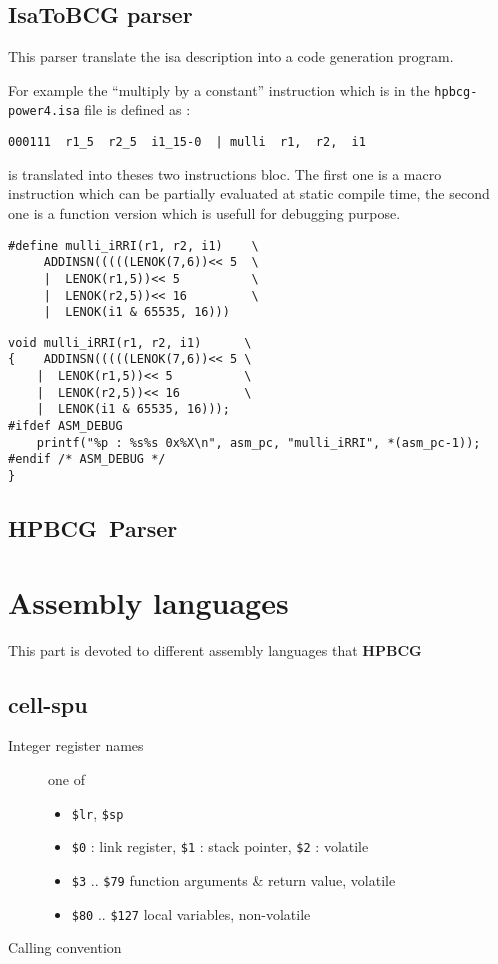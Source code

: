 \documentclass{article}
\newcommand{\hpbcg}{\textbf{HPBCG}\ }
\begin{document}
\subsection{IsaToBCG parser}

This parser translate the isa description into a code generation
program.

For example the ``multiply by a constant'' instruction which is in the
\texttt{hpbcg-power4.isa} file is defined as :

\begin{verbatim}
000111  r1_5  r2_5  i1_15-0  | mulli  r1,  r2,  i1
\end{verbatim}

is translated into theses two instructions bloc. The first one is a
macro instruction which can be partially evaluated at static compile
time, the second one is a function version which is usefull for
debugging purpose.

\begin{verbatim}
#define mulli_iRRI(r1, r2, i1)    \
     ADDINSN(((((LENOK(7,6))<< 5  \
     |  LENOK(r1,5))<< 5          \
     |  LENOK(r2,5))<< 16         \
     |  LENOK(i1 & 65535, 16)))
\end{verbatim}

\begin{verbatim}
void mulli_iRRI(r1, r2, i1)      \
{    ADDINSN(((((LENOK(7,6))<< 5 \
    |  LENOK(r1,5))<< 5          \
    |  LENOK(r2,5))<< 16         \
    |  LENOK(i1 & 65535, 16)));
#ifdef ASM_DEBUG
    printf("%p : %s%s 0x%X\n", asm_pc, "mulli_iRRI", *(asm_pc-1));
#endif /* ASM_DEBUG */
}
\end{verbatim}

\subsection{\hpbcg Parser}

\section{Assembly languages}

This part is devoted to different assembly languages that \hpbcg

\subsection{cell-spu}

\begin{description}
\item[Integer register names] one of
  \begin{itemize}
  \item \verb|$lr|, \verb|$sp|
  \item \verb|$0| : link register, \verb|$1| : stack pointer,
    \verb|$2| : volatile
  \item \verb|$3| .. \verb|$79| function arguments \& return value, volatile
  \item \verb|$80| .. \verb|$127| local variables, non-volatile
  \end{itemize}
\item[Calling convention] 
\end{description}
\end{document}
